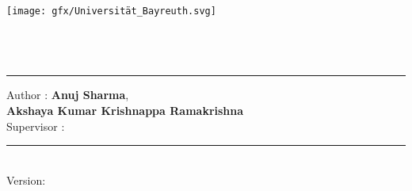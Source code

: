 %
\begin{titlepage}
	\texttt{[image: gfx/Universität\_Bayreuth.svg]} \\[2mm]
	\textsf{\thesisUniversityDepartment} \\
	\textsf{\thesisUniversityInstitute} \\
	\textsf{\thesisUniversityGroup} \\
	\textsf{\departmentHead}

		\flushright
	\vfill
	{\LARGE\thesisTitle \par}
	\rule[5pt]{\textwidth}{.4pt} \par
	\textbf{\Large\thesisName}
	\vfill
	\begin{flushleft}
		Author : \textbf{Anuj Sharma}, \\
		\hspace*{1.5cm}\textbf{Akshaya Kumar Krishnappa Ramakrishna}\\[2mm]
		Supervisor : \textbf{\thesisFirstSupervisor}
	\end{flushleft}
	\rule[5pt]{\textwidth}{.4pt} \par
	\textit{\large\thesisDate} \\
	Version: \thesisVersion
\end{titlepage}
